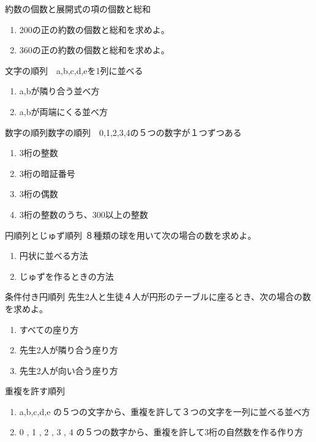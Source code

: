 \documentclass[10pt,dvipdfmx]{jsarticle}
\begin{document}
\begin{itembox}[l]{約数の個数と展開式の項の個数と総和}
  \begin{enumerate}
    \item 200の正の約数の個数と総和を求めよ。
    \item 360の正の約数の個数と総和を求めよ。
  \end{enumerate}
\end{itembox}
\begin{itembox}[l]{文字の順列　a,b,c,d,eを1列に並べる}
  \begin{enumerate}
    \item a,bが隣り合う並べ方
    \item a,bが両端にくる並べ方
  \end{enumerate}
\end{itembox}
\begin{itembox}[l]{数字の順列数字の順列　0,1,2,3,4の５つの数字が１つずつある}
  \begin{enumerate}
    \item 3桁の整数
    \item 3桁の暗証番号
    \item 3桁の偶数
    \item 3桁の整数のうち、300以上の整数
  \end{enumerate}
\end{itembox}
\begin{itembox}[l]{円順列とじゅず順列}
  ８種類の球を用いて次の場合の数を求めよ。
  \begin{enumerate}
    \item 円状に並べる方法
    \item じゅずを作るときの方法
  \end{enumerate}
\end{itembox}
\begin{itembox}[l]{条件付き円順列}
  先生2人と生徒４人が円形のテーブルに座るとき、次の場合の数を求めよ。
  \begin{enumerate}
    \item すべての座り方
    \item 先生2人が隣り合う座り方
    \item 先生2人が向い合う座り方
  \end{enumerate}
\end{itembox}
\begin{itembox}[l]{重複を許す順列}
  \begin{enumerate}
    \item a,b,c,d,e の５つの文字から、重複を許して３つの文字を一列に並べる並べ方
    \item 0 , 1 , 2 , 3 , 4 の５つの数字から、重複を許して3桁の自然数を作る作り方
  \end{enumerate}
\end{itembox}
\end{document}
